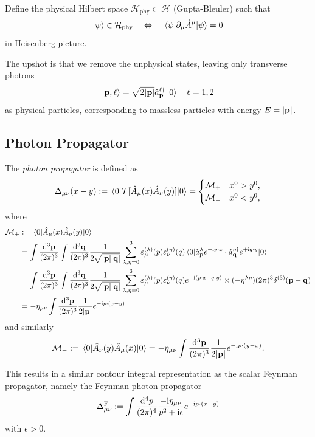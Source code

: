\documentclass[a4paper,11pt]{article}
\begin{document}
	Define the physical Hilbert space $\mathcal{H}_{\text{phy}} \subset \mathcal{H}$ (Gupta-Bleuler) such that 
	\[
		\ket{\psi} \in \mathcal{H}_{\text{phy}} \quad \Leftrightarrow \quad \mel{\psi}{\partial_\mu \hat A^\mu}{\psi} = 0
	\]
	in Heisenberg picture.

	The upshot is that we remove the unphysical states, leaving only transverse photons
	\[
		\ket{\vb p, \ell} = \sqrt{2 \abs{\vb p}} \hat a^{\ell\dagger}_{\vb p} \ket{0} \quad \ell = 1,2
	\]
	as physical particles, corresponding to massless particles with energy $E = \abs{\vb p}$.

	\subsection{Photon Propagator}

	The \emph{photon propagator} is defined as 
	\[
		\Delta _{\mu \nu} (x - y) := \mel{0}{\mathcal{T}[\hat A_\mu(x)\hat A_\nu(y)]}{0} = \begin{cases}
			\mathcal{M}_+ & x^0 > y^0,\\
			\mathcal{M}_- & x^0 < y^0,
		\end{cases}
	\]
	where
	\begin{align*}
		\mathcal{M}_+ &:= \mel{0}{\hat A_\mu(x)\hat A_\nu(y)}{0}\\
		& = \int \frac{\dd[3]{\vb p}}{(2\pi)^{3}} \int \frac{\dd[3]{\vb q}}{(2\pi)^{3}} \frac{1}{2 \sqrt{\abs{\vb p}\abs{\vb q}}} \sum _{\lambda, \eta = 0}^3 \varepsilon ^{(\lambda)}_\mu(p) \varepsilon ^{(\eta)}_\nu(q) \mel{0}{\hat a^\lambda _{\vb p} e ^{- \mathrm{i} p\cdot x} \cdot \hat a ^{\eta\dagger} _{\vb q} e ^{+ \mathrm{i} q \cdot y}}{0}\\
		& = \int \frac{\dd[3]{\vb p}}{(2\pi)^{3}} \int \frac{\dd[3]{\vb q}}{(2\pi)^{3}} \frac{1}{2 \sqrt{\abs{\vb p}\abs{\vb q}}} \sum _{\lambda, \eta = 0}^3 \varepsilon ^{(\lambda)}_\mu(p) \varepsilon ^{(\eta)}_\nu(q) e ^{- \mathrm{i}(p \cdot x - q \cdot y)} \times (- \eta ^{\lambda \eta}) (2 \pi)^3 \delta ^{(3)}(\vb p - \vb q)\\
		& = - \eta _{\mu \nu} \int \frac{\dd[3]{\vb p}}{(2\pi)^{3}} \frac{1}{2 \abs{\vb p}} e ^{- \mathrm{i} p \cdot (x-y)}
	\end{align*}
	and similarly
	\[
		\mathcal{M}_- := \mel{0}{\hat A_\nu(y)\hat A_\mu(x)}{0} = - \eta _{\mu \nu} \int \frac{\dd[3]{\vb p}}{(2\pi)^{3}} \frac{1}{2 \abs{\vb p}} e ^{- \mathrm{i} p \cdot (y-x)}.
	\]
	
	This results in a similar contour integral representation as the scalar Feynman propagator, namely the Feynman photon propagator
	\[
		\Delta ^{\text{F}}_{\mu \nu} := \int \frac{\dd[4]{p}}{(2\pi)^{4}} \frac{- \mathrm{i} \eta _{\mu \nu}}{p^2 +\mathrm{i} \epsilon} e ^{- \mathrm{i} p \cdot (x-y)}
	\]
	with $\epsilon > 0$.
	
\end{document}
